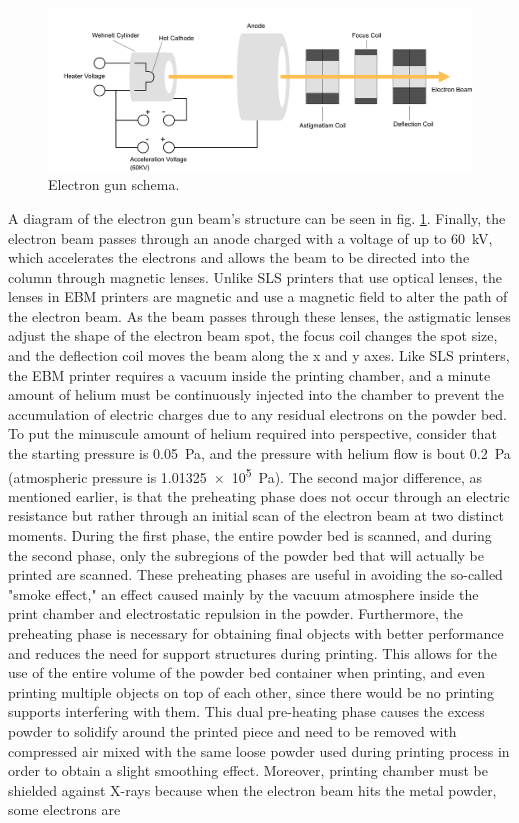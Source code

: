 \begin{figure}[H]
    \centering
    \includegraphics[scale=0.5]{Images/EBM.png}
    \caption[Electron gun schema.]{Electron gun schema.}
    \label{fig:electrongun}
\end{figure}

A diagram of the electron gun beam's structure can be seen in fig. \ref{fig:electrongun}. Finally, the electron beam passes through an anode charged with a voltage of up to \SI{60}{\kilo\volt}, which accelerates the electrons and allows the beam to be directed into the column through magnetic lenses. Unlike SLS printers that use optical lenses, the lenses in EBM printers are magnetic and use a magnetic field to alter the path of the electron beam. As the beam passes through these lenses, the astigmatic lenses adjust the shape of the electron beam spot, the focus coil changes the spot size, and the deflection coil moves the beam along the x and y axes. Like SLS printers, the EBM printer requires a vacuum inside the printing chamber, and a minute amount of helium must be continuously injected into the chamber to prevent the accumulation of electric charges due to any residual electrons on the powder bed. To put the minuscule amount of helium required into perspective, consider that the starting pressure is \SI{0,05}{\pascal}, and the pressure with helium flow is bout \SI{0,2}{\pascal} (atmospheric pressure is \SI{1,01325e5}{\pascal}). The second major difference, as mentioned earlier, is that the preheating phase does not occur through an electric resistance but rather through an initial scan of the electron beam at two distinct moments. During the first phase, the entire powder bed is scanned, and during the second phase, only the subregions of the powder bed that will actually be printed are scanned. These preheating phases are useful in avoiding the so-called "smoke effect," an effect caused mainly by the vacuum atmosphere inside the print chamber and electrostatic repulsion in the powder. Furthermore, the preheating phase is necessary for obtaining final objects with better performance and reduces the need for support structures during printing. This allows for the use of the entire volume of the powder bed container when printing, and even printing multiple objects on top of each other, since there would be no printing supports interfering with them. This dual pre-heating phase causes the excess powder to solidify around the printed piece and need to be removed with compressed air mixed with the same loose powder used during printing process in order to obtain a slight smoothing effect. Moreover, printing chamber must be shielded against X-rays because when the electron beam hits the metal powder, some electrons are 